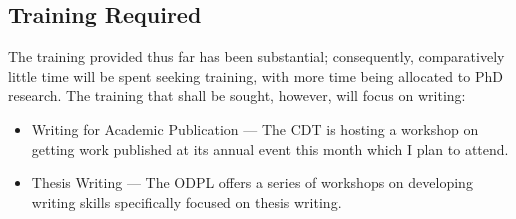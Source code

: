 \subsection{Training Required}\label{sub:training:required}

The training provided thus far has been substantial; consequently, comparatively
little time will be spent seeking training, with more time being allocated to
PhD research.
The training that shall be sought, however, will focus on writing:
\begin{itemize}
    \item Writing for Academic Publication --- The CDT is hosting a workshop on
        getting work published at its annual event this month which I plan to
        attend.
    \item Thesis Writing --- The ODPL offers a series of workshops on developing
        writing skills specifically focused on thesis writing.
\end{itemize}

\newpage
